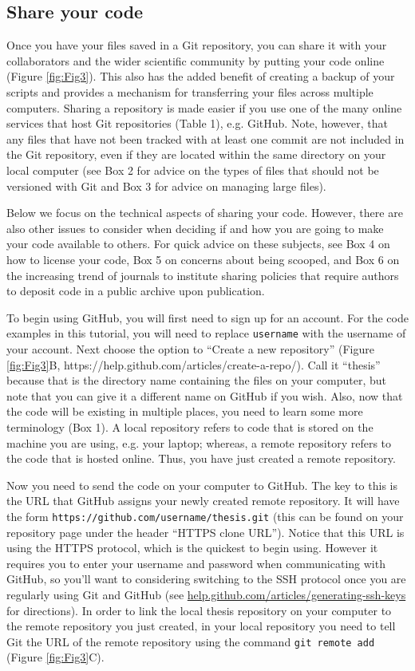\subsection{Share your code}

Once you have your files saved in a Git repository, you can share it with your collaborators and the wider scientific community by putting your code online (Figure \ref{fig:Fig3}).
This also has the added benefit of creating a backup of your scripts and provides a mechanism for transferring your files across multiple computers.
Sharing a repository is made easier if you use one of the many online services that host Git repositories (Table 1), e.g. GitHub.
Note, however, that any files that have not been tracked with at least one commit are not included in the Git repository, even if they are located within the same directory on your local computer (see Box 2 for advice on the types of files that should not be versioned with Git and Box 3 for advice on managing large files).

Below we focus on the technical aspects of sharing your code.
However, there are also other issues to consider when deciding if and how you are going to make your code available to others.
For quick advice on these subjects, see Box 4 on how to license your code, Box 5 on concerns about being scooped, and Box 6 on the increasing trend of journals to institute sharing policies that require authors to deposit code in a public archive upon publication.

To begin using GitHub, you will first need to sign up for an account.
For the code examples in this tutorial, you will need to replace \verb|username| with the username of your account.
Next choose the option to ``Create a new repository'' (Figure \ref{fig:Fig3}B, https://help.github.com/articles/create-a-repo/).
Call it ``thesis'' because that is the directory name containing the files on your computer, but note that you can give it a different name on GitHub if you wish.
Also, now that the code will be existing in multiple places, you need to learn some more terminology (Box 1).
A local repository refers to code that is stored on the machine you are using, e.g. your laptop; whereas, a remote repository refers to the code that is hosted online.
Thus, you have just created a remote repository.

Now you need to send the code on your computer to GitHub.
The key to this is the URL that GitHub assigns your newly created remote repository.
It will have the form \verb|https://github.com/username/thesis.git| (this can be found on your repository page under the header ``HTTPS clone URL'').
Notice that this URL is using the HTTPS protocol, which is the quickest to begin using.
However it requires you to enter your username and password when communicating with GitHub, so you'll want to considering switching to the SSH protocol once you are regularly using Git and GitHub (see \href{https://help.github.com/articles/generating-ssh-keys/}{help.github.com/articles/generating-ssh-keys} for directions).
In order to link the local thesis repository on your computer to the remote repository you just created, in your local repository you need to tell Git the URL of the remote repository using the command \verb|git remote add| (Figure \ref{fig:Fig3}C).

